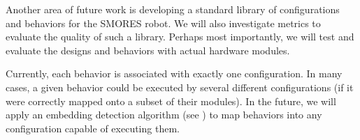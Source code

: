 \documentclass[conference]{IEEEtran}
\theoremstyle{definition}
\begin{document}
Another area of future work is developing a standard library of configurations and
behaviors for the SMORES robot.  We will also investigate metrics to evaluate the quality of such a library.
Perhaps most importantly, we will test and evaluate the designs and behaviors with actual hardware modules.

Currently, each behavior is associated with exactly one configuration. In many cases, a given behavior could be executed by several different configurations (if it were correctly mapped onto a subset of their modules). In the future, we will apply an embedding detection algorithm (see \cite{mantzouratos2014embeddability}) to map behaviors into any configuration capable of executing them.




\end{document}
